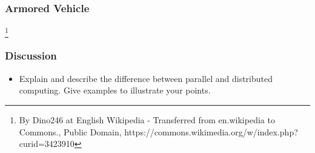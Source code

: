 \documentclass{beamer}
\begin{document}
\begin{CJK}{UTF8}{bsmi}
\begin{frame}
\frametitle{Armored Vehicle}
\centerline{}
\footnote{By Dino246 at English Wikipedia - Transferred from en.wikipedia to Commons., Public Domain, https://commons.wikimedia.org/w/index.php?curid=3423910}
\end{frame}

\begin{frame}
\frametitle{Discussion} 
\begin{itemize}
\item Explain and describe the difference between parallel and
  distributed computing.  Give examples to illustrate your points.
\end{itemize}
\end{frame}


\end{CJK}
\end{document}
